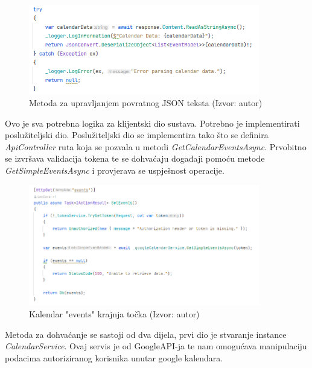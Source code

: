 \documentclass{foi}
\begin{document}
\begin{figure}[H]
    \centering
    \includegraphics[width=0.9\textwidth]{slike/calendarReturn.png}
    \caption{Metoda za upravljanjem povratnog JSON teksta (Izvor: autor)}
    \label{fig:calendarReturnList}

\end{figure}
Ovo je sva potrebna logika za klijentski dio sustava. Potrebno je implementirati poslužiteljski dio.
Poslužiteljski dio se implementira tako što se definira \textit{ApiController} ruta koja se pozvala u metodi \textit{GetCalendarEventsAsync}. 
Prvobitno se izvršava validacija tokena te se dohvaćaju događaji pomoću metode \textit{GetSimpleEventsAsync} i provjerava se uspješnost operacije.
\begin{figure}[H]
    \centering
    \includegraphics[width=0.9\textwidth]{slike/GetCalendarEventsEndpoint.png}
    \caption{Kalendar "events" krajnja točka (Izvor: autor)}
    \label{fig:GetCalendarEventsEndpoint}

\end{figure}
Metoda za dohvaćanje se sastoji od dva dijela, prvi dio je stvaranje instance \textit{CalendarService}. Ovaj servis je od GoogleAPI-ja te nam omogućava manipulaciju podacima autoriziranog korisnika unutar google kalendara.
\end{document}
